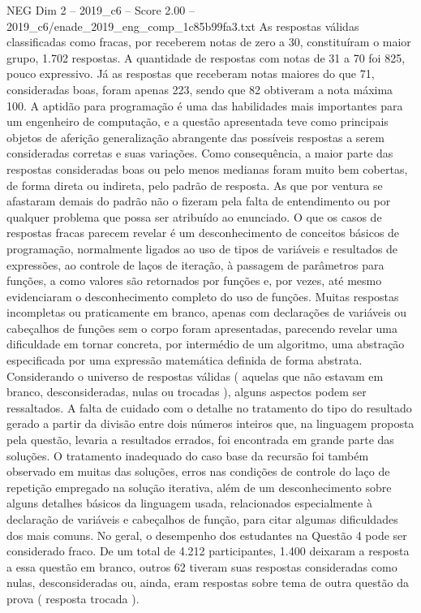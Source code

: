 \begin{textsample}{NEG Dim 2 – 2019\_c6 – Score 2.00 – 2019\_c6/enade\_2019\_eng\_comp\_1c85b99fa3.txt}
As respostas válidas classificadas como fracas, por receberem notas de zero a 30, constituíram o maior grupo, 1.702 respostas.
A quantidade de respostas com notas de 31 a 70 foi 825, pouco expressivo.
Já as respostas que receberam notas maiores do que 71, consideradas boas, foram apenas 223, sendo que 82 obtiveram a nota máxima 100.
A aptidão para programação é uma das habilidades mais importantes para um engenheiro de computação, e a questão apresentada teve como principais objetos de aferição generalização abrangente das possíveis respostas a serem consideradas corretas e suas variações.
Como consequência, a maior parte das respostas consideradas boas ou pelo menos medianas foram muito bem cobertas, de forma direta ou indireta, pelo padrão de resposta.
As que por ventura se afastaram demais do padrão não o fizeram pela falta de entendimento ou por qualquer problema que possa ser atribuído ao enunciado.
O que os casos de respostas fracas parecem revelar é um desconhecimento de conceitos básicos de programação, normalmente ligados ao uso de tipos de variáveis e resultados de expressões, ao controle de laços de iteração, à passagem de parâmetros para funções, a como valores são retornados por funções e, por vezes, até mesmo evidenciaram o desconhecimento completo do uso de funções.
Muitas respostas incompletas ou praticamente em branco, apenas com declarações de variáveis ou cabeçalhos de funções sem o corpo foram apresentadas, parecendo revelar uma dificuldade em tornar concreta, por intermédio de um algoritmo, uma abstração especificada por uma expressão matemática definida de forma abstrata.
Considerando o universo de respostas válidas ( aquelas que não estavam em branco, desconsideradas, nulas ou trocadas ), alguns aspectos podem ser ressaltados.
A falta de cuidado com o detalhe no tratamento do tipo do resultado gerado a partir da divisão entre dois números inteiros que, na linguagem proposta pela questão, levaria a resultados errados, foi encontrada em grande parte das soluções.
O tratamento inadequado do caso base da recursão foi também observado em muitas das soluções, erros nas condições de controle do laço de repetição empregado na solução iterativa, além de um desconhecimento sobre alguns detalhes básicos da linguagem usada, relacionados especialmente à declaração de variáveis e cabeçalhos de função, para citar algumas dificuldades dos mais comuns.
No geral, o desempenho dos estudantes na Questão 4 pode ser considerado fraco.
De um total de 4.212 participantes, 1.400 deixaram a resposta a essa questão em branco, outros 62 tiveram suas respostas consideradas como nulas, desconsideradas ou, ainda, eram respostas sobre tema de outra questão da prova ( resposta trocada ).

\end{textsample}
